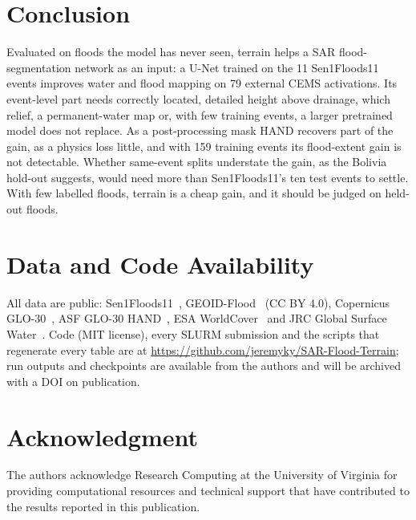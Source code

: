 \section{Conclusion}
\label{sec:conclusion}

Evaluated on floods the model has never seen, terrain helps a SAR flood-segmentation network as an input:
a U-Net trained on the 11 Sen1Floods11 events improves water and flood mapping on 79 external CEMS
activations. Its event-level part needs correctly located, detailed height above drainage, which relief, a
permanent-water map or, with few training events, a larger pretrained model does not replace.
As a post-processing mask HAND recovers part of the gain, as a physics loss little, and with 159 training
events its flood-extent gain is not detectable. Whether same-event splits understate the gain, as the
Bolivia hold-out suggests, would need more than Sen1Floods11's ten test events to settle. With few labelled
floods, terrain is a cheap gain, and it should be judged on held-out floods.

\section*{Data and Code Availability}
All data are public: Sen1Floods11~\cite{bonafilia2020sen1floods11}, GEOID-Flood~\cite{geoidflood} (CC BY
4.0), Copernicus GLO-30~\cite{glo30dem}, ASF GLO-30 HAND~\cite{asfhand}, ESA WorldCover~\cite{zanaga2022worldcover}
and JRC Global Surface Water~\cite{pekel2016gsw}. Code (MIT license), every SLURM submission and the scripts
that regenerate every table are at \url{https://github.com/jeremyky/SAR-Flood-Terrain}; run outputs and
checkpoints are available from the authors and will be archived with a DOI on publication.

\section*{Acknowledgment}
The authors acknowledge Research Computing at the University of Virginia for providing computational
resources and technical support that have contributed to the results reported in this publication.
